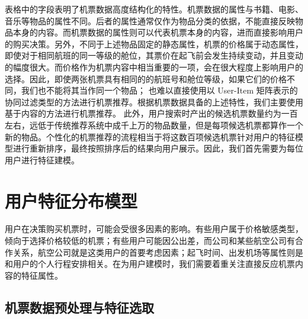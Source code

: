 表格中的字段表明了机票数据高度结构化的特性。机票数据的属性与书籍、电影、音乐等物品的属性不同。后者的属性通常仅作为物品分类的依据，不能直接反映物品本身的内容。而机票数据的属性则可以代表机票本身的内容，进而直接影响用户的购买决策。另外，不同于上述物品固定的静态属性，机票的价格属于动态属性，即使对于相同航班的同一等级的舱位，其票价在起飞前会发生持续变动，并且变动的幅度很大。而价格作为机票内容中相当重要的一项，会在很大程度上影响用户的选择。因此，即使两张机票具有相同的的航班号和舱位等级，如果它们的价格不同，我们也不能将其当作同一个物品；
也难以直接使用以 User-Item 矩阵表示的协同过滤类型的方法进行机票推荐。根据机票数据具备的上述特性，我们主要使用基于内容的方法进行机票推荐。
此外，用户搜索时产出的候选机票数量约为一百左右，远低于传统推荐系统中成千上万的物品数量，但是每项候选机票都算作一个新的物品。个性化的机票推荐的流程相当于将这数百项候选机票针对用户的特征模型进行重新排序，最终按照排序后的结果向用户展示。因此，我们首先需要为每位用户进行特征建模。

\section{用户特征分布模型}

用户在决策购买机票时，可能会受很多因素的影响。有些用户属于价格敏感类型，倾向于选择价格较低的机票；有些用户可能因公出差，而公司和某些航空公司有合作关系，航空公司就是这类用户的首要考虑因素；起飞时间、出发机场等属性则是和用户的个人行程安排相关。在为用户建模时，我们需要着重关注直接反应机票内容的特征属性。

\subsection{机票数据预处理与特征选取}


